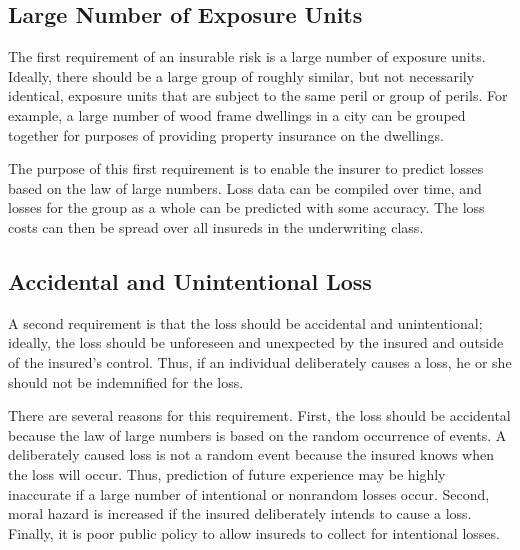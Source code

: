 \subsection{Large Number of Exposure Units}
The first requirement of an insurable risk is a large number of exposure units. Ideally, there should be a large group of roughly similar, but not necessarily identical, exposure units that are subject to the same peril or group of perils. For example, a large number of wood frame dwellings in a city can be grouped together for purposes of providing property insurance on the dwellings.\\
\par
The purpose of this first requirement is to enable the insurer to predict losses based on the law of large numbers. Loss data can be compiled over time, and losses for the group as a whole can be predicted with some accuracy. The loss costs can then be spread over all insureds in the underwriting class.
%
\subsection{Accidental and Unintentional Loss}
A second requirement is that the loss should be accidental and unintentional; ideally, the loss should be unforeseen and unexpected by the insured and outside of the insured’s control. Thus, if an individual deliberately causes a loss, he or she should not be indemnified for the loss.\\
\par
There are several reasons for this requirement. First, the loss should be accidental because the law of large numbers is based on the random occurrence of events. A deliberately caused loss is not a random event because the insured knows when the loss will occur. Thus, prediction of future experience may be highly inaccurate if a large number of intentional or nonrandom losses occur. Second, moral hazard is increased if the insured deliberately intends to cause a loss. Finally, it is poor public policy to allow insureds to collect for intentional losses.
%

